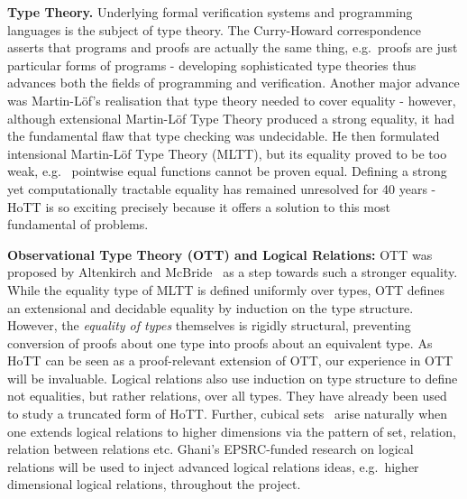 \documentclass[a4paper,11pt]{article}
\newcommand{\eg}{{e.g.}\ }
\begin{document}
{\bf Type Theory.} Underlying formal verification systems and
programming languages is the subject of type theory. The
Curry-Howard correspondence asserts that programs and proofs are
actually the same thing, \eg proofs are just particular forms of
programs - developing sophisticated type theories thus advances both 
the fields of programming and verification. Another
major advance was Martin-L\"of's realisation that type theory needed
to cover equality - however, although 
extensional Martin-L\"of Type Theory produced
a strong equality, it had the fundamental flaw that type
checking was undecidable. He then formulated intensional Martin-L\"of
Type Theory (MLTT), but its equality proved to be too weak, \eg
pointwise equal functions cannot be proven equal. Defining a strong yet
computationally tractable equality has remained unresolved for 40
years - HoTT is so exciting precisely because it offers a
solution to this most fundamental of problems.

{\bf Observational Type Theory (OTT) and Logical Relations:} OTT was
proposed by Altenkirch and McBride~\cite{alti:ott-conf} as a step
towards such a stronger equality. While the equality type of MLTT is
defined uniformly over types, OTT defines an extensional and
decidable equality by induction on the type structure. However, the
{\em equality of types} themselves is rigidly structural, preventing 
conversion of proofs about one type into proofs about an equivalent type. As
HoTT can be seen as a proof-relevant extension of OTT, our experience
in OTT will be invaluable.
Logical relations also use induction on type structure
to define not equalities, but rather relations, over all
types. They have already been
used~\cite{licataHarper:canonicity2d} to study a truncated form of
HoTT. Further, cubical sets~\cite{BezemM:cubsmt} 
arise naturally when one extends logical
relations to higher dimensions via the pattern of set, relation,
relation between relations etc. Ghani's EPSRC-funded research on
logical relations will be used to inject advanced logical relations
ideas, \eg higher dimensional logical relations, throughout
the project.




\end{document}
